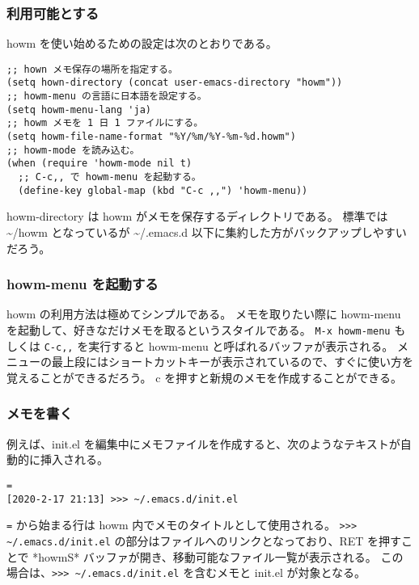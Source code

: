 \subsubsection{利用可能とする}
howm を使い始めるための設定は次のとおりである。
\begin{mdframed}[roundcorner=0.50zw,leftmargin=3.00zw,rightmargin=3.00zw,skipabove=0.40zw,skipbelow=0.40zw,innertopmargin=4.00pt,innerbottommargin=4.00pt,innerleftmargin=5.00pt,innerrightmargin=5.00pt,linecolor=gray!020,linewidth=0.50pt,backgroundcolor=gray!20]
\begin{verbatim}
;; hown メモ保存の場所を指定する。
(setq hown-directory (concat user-emacs-directory "howm"))
;; howm-menu の言語に日本語を設定する。
(setq howm-menu-lang 'ja)
;; howm メモを 1 日 1 ファイルにする。
(setq howm-file-name-format "%Y/%m/%Y-%m-%d.howm")
;; howm-mode を読み込む。
(when (require 'howm-mode nil t)
  ;; C-c,, で howm-menu を起動する。
  (define-key global-map (kbd "C-c ,,") 'howm-menu))
\end{verbatim}
\end{mdframed}
howm-directory は howm がメモを保存するディレクトリである。
標準では \textasciitilde{}/howm となっているが \textasciitilde{}/.emacs.d 以下に集約した方がバックアップしやすいだろう。
\subsubsection{howm-menu を起動する}
howm の利用方法は極めてシンプルである。
メモを取りたい際に howm-menu を起動して、好きなだけメモを取るというスタイルである。
\texttt{M-x howm-menu} もしくは \texttt{C-c\hphantom{.},\hphantom{.},} を実行すると howm-menu と呼ばれるバッファが表示される。
メニューの最上段にはショートカットキーが表示されているので、すぐに使い方を覚えることができるだろう。
c を押すと新規のメモを作成することができる。
\subsubsection{メモを書く}
例えば、init.el を編集中にメモファイルを作成すると、次のようなテキストが自動的に挿入される。
\begin{mdframed}[roundcorner=0.50zw,leftmargin=3.00zw,rightmargin=3.00zw,skipabove=0.40zw,skipbelow=0.40zw,innertopmargin=4.00pt,innerbottommargin=4.00pt,innerleftmargin=5.00pt,innerrightmargin=5.00pt,linecolor=gray!020,linewidth=0.50pt,backgroundcolor=gray!20]
\begin{verbatim}
=
[2020-2-17 21:13] >>> ~/.emacs.d/init.el
\end{verbatim}
\end{mdframed}
\verb'=' から始まる行は howm 内でメモのタイトルとして使用される。
\verb'>>> ~/.emacs.d/init.el' の部分はファイルへのリンクとなっており、RET を押すことで *howmS* バッファが開き、移動可能なファイル一覧が表示される。
この場合は、\verb'>>> ~/.emacs.d/init.el' を含むメモと init.el が対象となる。\\

